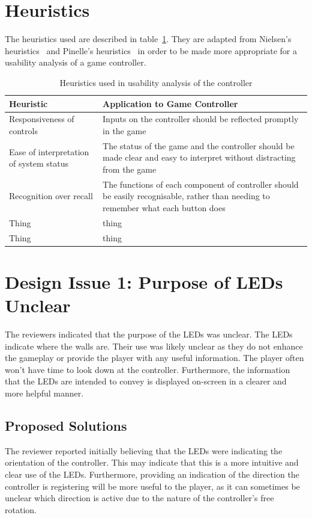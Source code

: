 \documentclass{scrartcl}
\begin{document}
\section{Heuristics}
The heuristics used are described in table~\ref{table:heuristics}. They are adapted from Nielsen's heuristics~\cite{nielsen:heuristics} and Pinelle's heuristics~\cite{pinelle:heuristic} in order to be made more appropriate for a usability analysis of a game controller.

\begin{table}
\centering
\begin{tabular}{| l | p{6cm} |}
\hline
\textbf{Heuristic} & \textbf{Application to Game Controller} \\ \hline
Responsiveness of controls & Inputs on the controller should be reflected promptly in the game \\ \hline
Ease of interpretation of system status & The status of the game and the controller should be made clear and easy to interpret without distracting from the game \\ \hline
Recognition over recall & The functions of each component of controller should be easily recognisable, rather than needing to remember what each button does \\ \hline
Thing & thing \\ \hline
Thing & thing \\ \hline
\end{tabular}
\caption{Heuristics used in usability analysis of the controller}
\label{table:heuristics}
\end{table}

\section{Design Issue 1: Purpose of LEDs Unclear}
The reviewers indicated that the purpose of the LEDs was unclear. The LEDs indicate where the walls are. Their use was likely unclear as they do not enhance the gameplay or provide the player with any useful information. The player often won't have time to look down at the controller. Furthermore, the information that the LEDs are intended to convey is displayed on-screen in a clearer and more helpful manner.

\subsection{Proposed Solutions}
The reviewer reported initially believing that the LEDs were indicating the orientation of the controller. This may indicate that this is a more intuitive and clear use of the LEDs. Furthermore, providing an indication of the direction the controller is registering will be more useful to the player, as it can sometimes be unclear which direction is active due to the nature of the controller's free rotation. 
\end{document}
